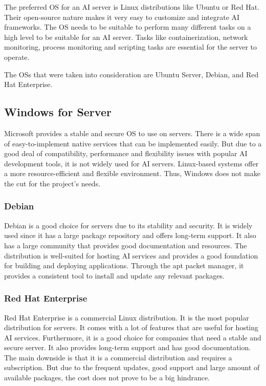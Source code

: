 The preferred OS for an AI server is Linux distributions like Ubuntu or Red Hat.
Their open-source nature makes it very easy to customize and integrate AI frameworks.
The OS needs to be suitable to perform many different tasks on a high level to be suitable for an AI server. 
Tasks like containerization, network monitoring, process monitoring and scripting tasks are essential for the server to operate.


The OSs that were taken into consideration are Ubuntu Server, Debian, and Red Hat Enterprise. 


\cite{cao2024managing}


\subsection{Windows for Server}

Microsoft provides a stable and secure OS to use on servers. There is a wide span of easy-to-implement native services that can be implemented easily.
But due to a good deal of compatibility, performance and flexibility issues with popular AI development tools, it is not widely used for AI servers. 
Linux-based systems offer a more resource-efficient and flexible environment. Thus, Windows does not make the cut for the project's needs.

\subsubsection{Debian}

Debian is a good choice for servers due to its stability and security. It is widely used since it has a large package repository and offers long-term support. It also has a large community that provides good documentation and resources. The distribution is well-suited for hosting AI services and provides a good foundation for building and deploying applications.
Through the apt packet manager, it provides a consistent tool to install and update any relevant packages.

\cite{LinuxForServerDebian}

\subsubsection{Red Hat Enterprise}

Red Hat Enterprise is a commercial Linux distribution. It is the most popular distribution for servers. It comes with a lot of features that are useful for hosting AI services. Furthermore, it is a good choice for companies that need a stable and secure server. It also provides long-term support and has good documentation.
The main downside is that it is a commercial distribution and requires a subscription. But due to the frequent updates, good support and large amount of available packages, the cost does not prove to be a big hindrance.

